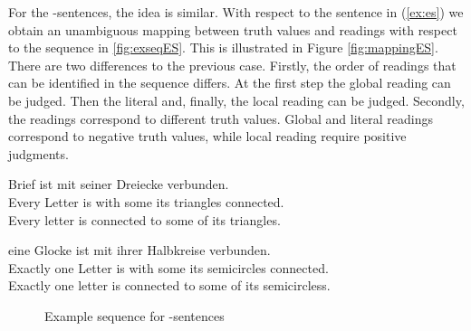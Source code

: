 \documentclass[fleqn,reqno,10pt,draft]{article}
\newcommand{\as}{\acro{as}}
\renewcommand{\es}{\acro{es}}
\begin{document}
For the \es-sentences, the idea is similar. With respect to the
sentence in (\ref{ex:es}) we obtain an unambiguous mapping between
truth values and readings with respect to the sequence in
\ref{fig:exseqES}. This is illustrated in Figure
\ref{fig:mappingES}. There are two differences to the previous
case. Firstly, the order of readings that can be identified in the
sequence differs. At the first step the global reading can be
judged. Then the literal and, finally, the local reading can be
judged. Secondly, the readings correspond to different truth
values. Global and literal readings correspond to negative truth
values, while local reading require positive judgments.

\begin{exe}
\ex \label{ex:as}  Brief ist mit  seiner Dreiecke verbunden.\\
Every Letter is with some its triangles connected.\\
Every letter is connected to some of its triangles.
\end{exe}


\begin{exe}
\ex \label{ex:es} \gll {} eine Glocke ist mit  ihrer Halbkreise verbunden.\\
  Exactly one Letter is with some its semicircles connected.\\
  \trans Exactly one letter is connected to some of its semicircless.
\end{exe}


\begin{figure}[ht]
	\centering
	\caption[]{Example sequence for \as-sentences}
	\label{fig:exseqAS}
\end{figure}
\end{document}
